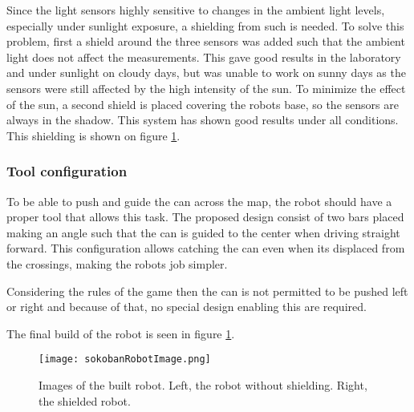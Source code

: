 Since the light sensors highly sensitive to changes in the ambient light levels, especially under sunlight exposure, a shielding from such is needed.
To solve this problem, first a shield around the three sensors was added such that the ambient light does not affect the measurements.
This gave good results in the laboratory and under sunlight on cloudy days, but was unable to work on sunny days as the sensors were still affected by the high intensity of the sun.
To minimize the effect of the sun, a second shield is placed covering the robots base, so the sensors are always in the shadow.
This system has shown good results under all conditions.
This shielding is shown on figure \ref{fig:robotImage}.



\subsubsection{Tool configuration}

To be able to push and guide the can across the map, the robot should have a proper tool that allows this task. 
The proposed design consist of two bars placed making an angle such that the can is guided to the center when driving straight forward.
This configuration allows catching the can even when its displaced from the crossings, making the robots job simpler.

Considering the rules of the game then the can is not permitted to be pushed left or right and because of that, no special design enabling this are required.


The final build of the robot is seen in figure \ref{fig:robotImage}.

\begin{figure}[H]
\texttt{[image: sokobanRobotImage.png]}
\centering
\caption{Images of the built robot. Left, the robot without shielding. Right, the shielded robot.}
\label{fig:robotImage}
\end{figure}

